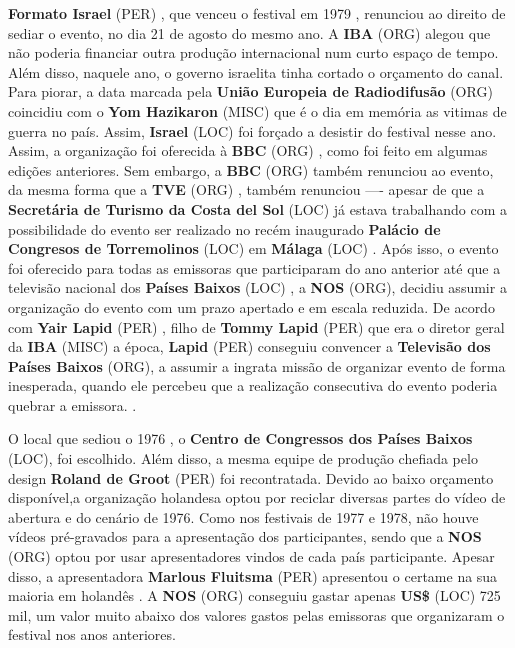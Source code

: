 \documentclass[12pt,a4paper]{article}
\begin{document}
\textbf{Formato Israel} (PER) , que venceu o festival em 1979 , renunciou ao direito de sediar o evento, no dia 21 de agosto do mesmo ano. A \textbf{IBA} (ORG) alegou que não poderia financiar outra produção internacional num curto espaço de tempo. Além disso, naquele ano, o governo israelita tinha cortado o orçamento do canal. Para piorar, a data marcada pela \textbf{União Europeia de Radiodifusão} (ORG) coincidiu com o \textbf{Yom Hazikaron} (MISC) que é o dia em memória as vitimas de guerra no país. Assim, \textbf{Israel} (LOC) foi forçado a desistir do festival nesse ano. Assim, a organização foi oferecida à \textbf{BBC} (ORG) , como foi feito em algumas edições anteriores. Sem embargo, a \textbf{BBC} (ORG) também renunciou ao evento, da mesma forma que a \textbf{TVE} (ORG) , também renunciou ---- apesar de que a \textbf{Secretária de Turismo da Costa del Sol} (LOC) já estava trabalhando com a possibilidade do evento ser realizado no recém inaugurado \textbf{Palácio de Congresos de Torremolinos} (LOC) em \textbf{Málaga} (LOC) . Após isso, o evento foi oferecido para todas as emissoras que participaram do ano anterior até que a televisão nacional dos \textbf{Países Baixos} (LOC) , a \textbf{NOS} (ORG), decidiu assumir a organização do evento com um prazo apertado e em escala reduzida. De acordo com \textbf{Yair Lapid} (PER) , filho de \textbf{Tommy Lapid} (PER) que era o diretor geral da \textbf{IBA} (MISC) a época, \textbf{Lapid} (PER) conseguiu convencer a \textbf{Televisão dos Países Baixos} (ORG), a assumir a ingrata missão de organizar evento de forma inesperada, quando ele percebeu que a realização consecutiva do evento poderia quebrar a emissora. .

O local que sediou o 1976 , o \textbf{Centro de Congressos dos Países Baixos} (LOC), foi escolhido. Além disso, a mesma equipe de produção chefiada pelo design \textbf{Roland de Groot} (PER) foi recontratada. Devido ao baixo orçamento disponível,a organização holandesa optou por reciclar diversas partes do vídeo de abertura e do cenário de 1976. Como nos festivais de 1977 e 1978, não houve vídeos pré-gravados para a apresentação dos participantes, sendo que a \textbf{NOS} (ORG) optou por usar apresentadores vindos de cada país participante. Apesar disso, a apresentadora \textbf{Marlous Fluitsma} (PER) apresentou o certame na sua maioria em holandês . A \textbf{NOS} (ORG) conseguiu gastar apenas \textbf{US\$} (LOC) 725 mil, um valor muito abaixo dos valores gastos pelas emissoras que organizaram o festival nos anos anteriores.
\end{document}
